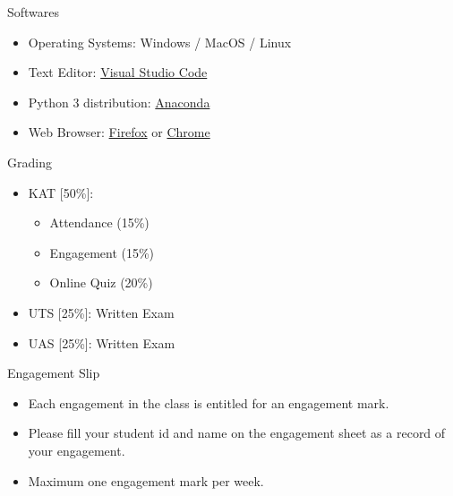 \documentclass[ignorenonframetext,]{beamer}
\providecommand{\tightlist}{%
  \setlength{\itemsep}{0pt}\setlength{\parskip}{0pt}}
\begin{document}
\begin{frame}{Softwares}
\protect\hypertarget{softwares}{}

\begin{itemize}
\tightlist
\item
  Operating Systems: Windows / MacOS / Linux
\item
  Text Editor: \href{https://code.visualstudio.com/}{Visual Studio Code}
\item
  Python 3 distribution:
  \href{https://www.anaconda.com/download/}{Anaconda}
\item
  Web Browser:
  \href{https://www.mozilla.org/en-US/firefox/new/}{Firefox} or
  \href{https://www.google.com/chrome/browser/desktop/index.html}{Chrome}
\end{itemize}

\end{frame}

\begin{frame}{Grading}
\protect\hypertarget{grading}{}

\begin{itemize}
\tightlist
\item
  KAT {[}50\%{]}:

  \begin{itemize}
  \tightlist
  \item
    Attendance (15\%)
  \item
    Engagement (15\%)
  \item
    Online Quiz (20\%)
  \end{itemize}
\item
  UTS {[}25\%{]}: Written Exam
\item
  UAS {[}25\%{]}: Written Exam
\end{itemize}

\end{frame}

\begin{frame}{Engagement Slip}
\protect\hypertarget{engagement-slip}{}

\begin{itemize}
\tightlist
\item
  Each engagement in the class is entitled for an engagement mark.
\item
  Please fill your student id and name on the engagement sheet as a
  record of your engagement.
\item
  Maximum one engagement mark per week.
\end{itemize}

\end{frame}
\end{document}
